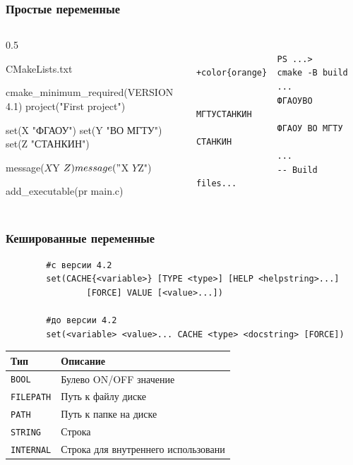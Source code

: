\documentclass[10pt, aspectratio=1610]{beamer}
\begin{document}
\begin{frame}[fragile]\frametitle{Простые переменные}
	\begin{columns}[]
		\edef\colA{0.5}
		\begin{column}{\colA\linewidth}
			\begin{block}{CMakeLists.txt}
				\begin{cmakecode}
					cmake_minimum_required(VERSION 4.1)
					project("First project")
					
					set(X "ФГАОУ")
					set(Y "ВО МГТУ")
					set(Z "СТАНКИН")
					
					message(${X} ${Y} ${Z})
					message("${X} ${Y} ${Z}")
					
					add_executable(pr main.c)
				\end{cmakecode}
			\end{block}

		\end{column}
		\begin{column}{\fpeval{1-\colA}\linewidth}
				\begin{Verbatim}[bgcolor=black,tabsize=4,formatcom=\color{white},gobble=4,fontsize=\footnotesize, xleftmargin=0em, frame=single,framerule=0pt ,rulecolor=\color{red},framesep=1em,fillcolor=\color{black},commandchars=+\{\}]
				
				PS ...> +color{orange}  cmake -B build
				...
				ФГАОУВО МГТУСТАНКИН
				ФГАОУ ВО МГТУ СТАНКИН
				...
				-- Build files...
				
			\end{Verbatim}
		\end{column}
	\end{columns}	
\end{frame}

\begin{frame}[fragile]\frametitle{Кешированные переменные}
	
	\begin{verbatim}
		#c версии 4.2
		set(CACHE{<variable>} [TYPE <type>] [HELP <helpstring>...] 
				[FORCE] VALUE [<value>...])
		
		#до версии 4.2
		set(<variable> <value>... CACHE <type> <docstring> [FORCE])
	\end{verbatim}
	
	\vspace{1em}
	
	\begin{tabular}{|l|l|}
		\hline
		\textbf{Тип} &  \textbf{Описание} \\\hline
		\Verb|BOOL|  &  Булево ON/OFF значение \\\hline
		\Verb|FILEPATH|  &  Путь к файлу  диске  \\\hline
		\Verb|PATH|  & Путь к папке на диске  \\\hline
		\Verb|STRING|  &  Строка\\\hline
		\Verb|INTERNAL|  & Строка для внутреннего использовани  \\\hline
	\end{tabular}

\end{frame}
\end{document}

